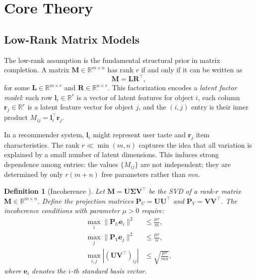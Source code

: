 \documentclass[conference]{IEEEtran}
\newtheorem{definition}{Definition}
\begin{document}
\section{Core Theory}
\label{sec:theory}

\subsection{Low-Rank Matrix Models}

The low-rank assumption is the fundamental structural prior in matrix completion. A matrix $\mathbf{M} \in \mathbb{R}^{m \times n}$ has rank $r$ if and only if it can be written as
\begin{equation}
  \mathbf{M} = \mathbf{L}\mathbf{R}^\top,
  \label{eq:lowrank_factor}
\end{equation}
for some $\mathbf{L} \in \mathbb{R}^{m \times r}$ and $\mathbf{R} \in \mathbb{R}^{n \times r}$. This factorization encodes a \emph{latent factor model}: each row $\mathbf{l}_i \in \mathbb{R}^r$ is a vector of latent features for object $i$, each column $\mathbf{r}_j \in \mathbb{R}^r$ is a latent feature vector for object $j$, and the $(i,j)$ entry is their inner product $M_{ij} = \mathbf{l}_i^\top \mathbf{r}_j$.

In a recommender system, $\mathbf{l}_i$ might represent user taste and $\mathbf{r}_j$ item characteristics. The rank $r \ll \min(m,n)$ captures the idea that all variation is explained by a small number of latent dimensions. This induces strong dependence among entries: the values $\{M_{ij}\}$ are not independent; they are determined by only $r(m+n)$ free parameters rather than $mn$.

\begin{definition}[Incoherence \cite{candes2009exact}]
  Let $\mathbf{M} = \mathbf{U}\boldsymbol{\Sigma}\mathbf{V}^\top$ be the SVD of a rank-$r$ matrix $\mathbf{M} \in \mathbb{R}^{m \times n}$. Define the projection matrices $\mathbf{P}_U = \mathbf{U}\mathbf{U}^\top$ and $\mathbf{P}_V = \mathbf{V}\mathbf{V}^\top$. The incoherence conditions with parameter $\mu > 0$ require:
  \begin{align}
    \max_i \|\mathbf{P}_U \mathbf{e}_i\|^2 &\leq \frac{\mu r}{m}, \label{eq:incoh1}\\
    \max_j \|\mathbf{P}_V \mathbf{e}_j\|^2 &\leq \frac{\mu r}{n}, \label{eq:incoh2}\\
    \max_{i,j} |(\mathbf{U}\mathbf{V}^\top)_{ij}| &\leq \sqrt{\frac{\mu r}{mn}}, \label{eq:incoh3}
  \end{align}
  where $\mathbf{e}_i$ denotes the $i$-th standard basis vector.
\end{definition}
\end{document}
